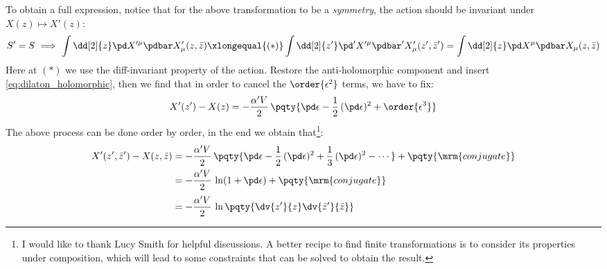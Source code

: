 \documentclass[a4paper,10pt]{article}
\begin{document}
\begin{enumerate}
\begin{enumerate}
	To obtain a full expression, notice that for the above transformation to be a \textit{symmetry}, the action should be invariant under $X(z)\mapsto X'(z)$:
	\begin{equation}
		S' = S
		\ \Longrightarrow\ %
		\int \dd[2]{z}
			\pd X'^\mu \pdbar X'_\mu (z,\bar{z})
		\xlongequal{(*)} \int \dd[2]{z'}
			\pd' X'^\mu \pdbar' X'_\mu (z',\bar{z}')
		= \int \dd[2]{z}
			\pd X^\mu \pdbar X_\mu (z,\bar{z})
	\end{equation}
	Here at $(*)$ we use the diff-invariant property of the action. 
	Restore the anti-holomorphic component and insert \eqref{eq:dilaton_holomorphic}, then we find that in order to cancel the $\order{\epsilon^2}$ terms, we have to fix:
	\begin{equation}
		X'(z') - X(z)
		= -\frac{\alpha' V}{2}\,\pqty{
			\pd\epsilon
			- \frac{1}{2}\,(\pd\epsilon)^2
			+ \order{\epsilon^3}
		}
	\end{equation}
	The above process can be done order by order, in the end we obtain that\footnote{
		I would like to thank Lucy Smith for helpful discussions. A better recipe to find finite transformations is to consider its properties under composition, which will lead to some constraints that can be solved to obtain the result. 
	}:
	\begin{equation}
	\begin{aligned}
		X'(z',\bar{z}') - X(z,\bar{z})
		&= -\frac{\alpha' V}{2}\,\pqty{
			\pd\epsilon
			- \frac{1}{2}\,(\pd\epsilon)^2
			+ \frac{1}{3}\,(\pd\epsilon)^2
			- \cdots
		} + \pqty{\mrm{conjugate}} \\
		&= -\frac{\alpha' V}{2}\,
			\ln (1 + \pd\epsilon)
		+ \pqty{\mrm{conjugate}} \\[.5ex]
		&= -\frac{\alpha' V}{2}\,
			\ln \pqty{
				\dv{z'}{z}
				\dv{\bar{z}'}{\bar{z}}
			}
	\end{aligned}
	\end{equation}
	

\end{enumerate}
\end{enumerate}
\end{document}
